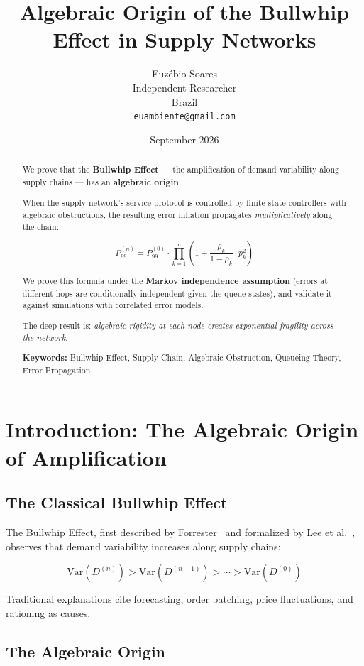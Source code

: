 \documentclass[11pt]{article}
\title{Algebraic Origin of the Bullwhip Effect in Supply Networks}
\author{Euz\'{e}bio Soares \\
Independent Researcher \\
Brazil \\
\texttt{euambiente@gmail.com}}
\date{September 2026}
\begin{document}
\maketitle

\begin{abstract}
We prove that the \textbf{Bullwhip Effect} --- the amplification of demand variability along supply chains --- has an \textbf{algebraic origin}. 

When the supply network's service protocol is controlled by finite-state controllers with algebraic obstructions, the resulting error inflation propagates \textit{multiplicatively} along the chain:

$$P_{99}^{(n)} = P_{99}^{(0)} \cdot \prod_{k=1}^{n} \left(1 + \frac{\rho_k}{1-\rho_k} \cdot p_k^2\right)$$

We prove this formula under the \textbf{Markov independence assumption} (errors at different hops are conditionally independent given the queue states), and validate it against simulations with correlated error models.

The deep result is: \textit{algebraic rigidity at each node creates exponential fragility across the network.}

\textbf{Keywords:} Bullwhip Effect, Supply Chain, Algebraic Obstruction, Queueing Theory, Error Propagation.
\end{abstract}

\section{Introduction: The Algebraic Origin of Amplification}

\subsection{The Classical Bullwhip Effect}

The Bullwhip Effect, first described by Forrester~\cite{forrester1958industrial} and formalized by Lee et al.~\cite{lee1997bullwhip}, observes that demand variability increases along supply chains:

$$\text{Var}(D^{(n)}) > \text{Var}(D^{(n-1)}) > \cdots > \text{Var}(D^{(0)})$$

Traditional explanations cite forecasting, order batching, price fluctuations, and rationing as causes.

\subsection{The Algebraic Origin}
\end{document}
